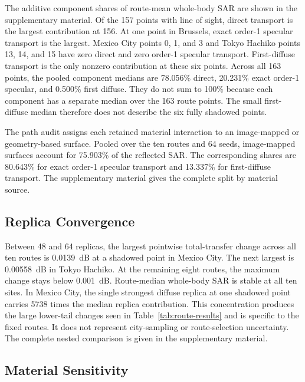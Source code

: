 \documentclass{ieeeaccess}
\begin{document}
The additive component shares of route-mean whole-body SAR are shown in the
supplementary material. Of the 157 points with line of sight, direct transport
is the largest contribution at 156. At one point in Brussels, exact order-1
specular transport is the largest. Mexico City points 0, 1, and 3 and Tokyo
Hachiko points 13, 14, and 15 have zero direct and zero order-1 specular
transport. First-diffuse transport is the only nonzero contribution at these six
points. Across all 163 points, the pooled component medians are 78.056\% direct,
20.231\% exact order-1 specular, and 0.500\% first diffuse. They do not sum to
100\% because each component has a separate median over the 163 route points. The
small first-diffuse median therefore does not describe the six fully shadowed
points.

The path audit assigns each retained material interaction to an image-mapped or
geometry-based surface. Pooled over the ten routes and 64 seeds, image-mapped
surfaces account for 75.903\% of the reflected SAR. The
corresponding shares are 80.643\% for exact order-1 specular transport and
13.337\% for first-diffuse transport. The supplementary material gives the
complete split by material source.

\subsection{Replica Convergence}
\label{sec:convergence}

Between 48 and 64 replicas, the largest pointwise total-transfer change across
all ten routes is 0.0139~dB at a shadowed point in Mexico City. The next largest
is 0.00558~dB in Tokyo Hachiko. At the remaining eight routes, the maximum
change stays below 0.001~dB. Route-median whole-body SAR is stable at all ten
sites.
In Mexico City, the single strongest diffuse replica at one shadowed point
carries 5738 times the median replica contribution. This concentration produces
the large lower-tail changes seen in
Table~\ref{tab:route-results} and is specific to the fixed routes. It does not
represent city-sampling or route-selection uncertainty. The complete nested
comparison is given in the supplementary material.

\subsection{Material Sensitivity}
\label{sec:material-sensitivity}
\end{document}
